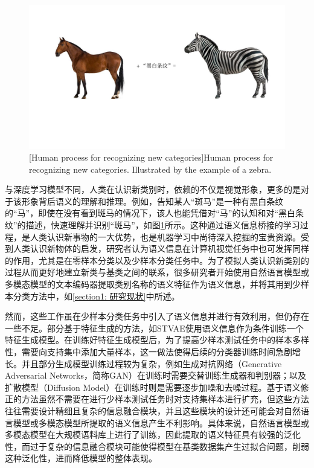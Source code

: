\begin{figure}[h!]
  \centering
  \includegraphics[width=0.9\columnwidth]{figures/SVMSMA/人类认识新类别示意图.pdf}
  [Human process for recognizing new categories]{Human process for recognizing new categories. Illustrated by the example of a zebra.}
  \label{figure4: 人类认识新类别示意图}
\end{figure}

与深度学习模型不同，人类在认识新类别时，依赖的不仅是视觉形象，更多的是对于该形象背后语义的理解和推理。例如，告知某人“斑马”是一种有黑白条纹的“马”，即使在没有看到斑马的情况下，该人也能凭借对“马”的认知和对“黑白条纹”的描述，快速理解并识别“斑马”，如图\ref{figure4: 人类认识新类别示意图}所示。这种通过语义信息桥接的学习过程，是人类认识新事物的一大优势，也是机器学习中尚待深入挖掘的宝贵资源。受到人类认识新物体的启发，研究者认为语义信息在计算机视觉任务中也可发挥同样的作用，尤其是在零样本分类\cite{metric1, metric2, generative1, generative2, 冯耀功2020基于知识的零样本视觉识别综述, 零样本学习, 赵鹏2021一种基于融合重构的子空间学习的零样本图像分类方法}以及少样本分类\cite{KTN, AM3, TRAML, yan2021aligning, CMGNN-DPGN, STVAE, SP-CLIP, 赵凯琳2020小样本学习研究综述, 刘颖2021基于小样本学习的图像分类技术综述, 小样本困境下的深度学习图像识别综述}任务中。为了模拟人类认识新类别的过程从而更好地建立新类与基类之间的联系，很多研究者开始使用自然语言模型\cite{Word2Vec, GloVe, Bert}或多模态模型\cite{Clip}的文本编码器提取类别名称的语义特征作为语义信息，并将其用到少样本分类方法中，如\ref{section1: 研究现状}中所述。


然而，这些工作虽在少样本分类任务中引入了语义信息并进行有效利用，但仍存在一些不足。部分基于特征生成的方法，如STVAE\cite{STVAE}使用语义信息作为条件训练一个特征生成模型。在训练好特征生成模型后，为了提高少样本测试任务中的样本多样性，需要向支持集中添加大量样本，这一做法使得后续的分类器训练时间急剧增长。并且部分生成模型训练过程较为复杂，例如生成对抗网络（Generative Adversarial Networks，简称GAN）\cite{GAN}在训练时需要交替训练生成器和判别器；以及扩散模型（Diffusion Model）\cite{diffusion}在训练时则是需要逐步加噪和去噪过程。基于语义修正的方法\cite{AM3, SP-CLIP}虽然不需要在进行少样本测试任务时对支持集样本进行扩充，但这些方法往往需要设计精细且复杂的信息融合模块，并且这些模块的设计还可能会对自然语言模型或多模态模型所提取的语义信息产生不利影响。具体来说，自然语言模型或多模态模型在大规模语料库上进行了训练，因此提取的语义特征具有较强的泛化性，而过于复杂的信息融合模块可能使得模型在基类数据集产生过拟合问题，削弱这种泛化性，进而降低模型的整体表现。


